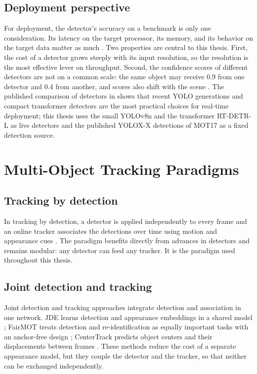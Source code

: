 \subsection{Deployment perspective}
For deployment, the detector's accuracy on a benchmark is only one consideration. Its latency on the target processor, its memory, and its behavior on the target data matter as much \cite{bakirci2025lowpower}. Two properties are central to this thesis. First, the cost of a detector grows steeply with its input resolution, so the resolution is the most effective lever on throughput. Second, the confidence scores of different detectors are not on a common scale: the same object may receive 0.9 from one detector and 0.4 from another, and scores also shift with the scene \cite{kuppers2020detcalib}. The published comparison of detectors in \cite{ismail2026realtime} shows that recent YOLO generations and compact transformer detectors are the most practical choices for real-time deployment; this thesis uses the small YOLOv8n and the transformer RT-DETR-L as live detectors and the published YOLOX-X detections of MOT17 as a fixed detection source.

\section{Multi-Object Tracking Paradigms}\label{sec:bg-paradigms}

\subsection{Tracking by detection}
In tracking by detection, a detector is applied independently to every frame and an online tracker associates the detections over time using motion and appearance cues \cite{bewley2016sort,wojke2017deepsort}. The paradigm benefits directly from advances in detectors and remains modular: any detector can feed any tracker. It is the paradigm used throughout this thesis.

\subsection{Joint detection and tracking}
Joint detection and tracking approaches integrate detection and association in one network. JDE learns detection and appearance embeddings in a shared model \cite{wang2020jde}; FairMOT treats detection and re-identification as equally important tasks with an anchor-free design \cite{zhang2021fairmot}; CenterTrack predicts object centers and their displacements between frames \cite{zhou2020centertrack}. These methods reduce the cost of a separate appearance model, but they couple the detector and the tracker, so that neither can be exchanged independently.

